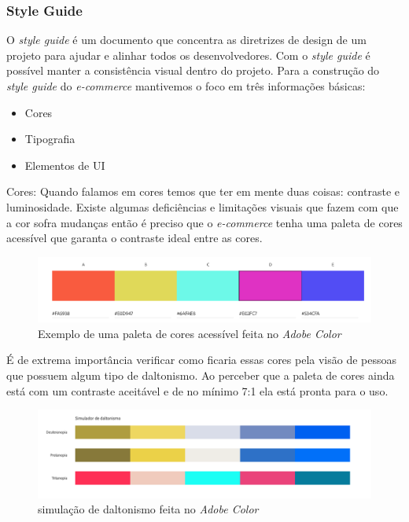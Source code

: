 \newpage
\subsubsection{Style Guide}
{O \textit{style guide} é um documento que concentra as diretrizes de design de um projeto para ajudar e alinhar todos os desenvolvedores. Com o \textit{style guide} é possível manter a consistência visual dentro do projeto. Para a construção do \textit{style guide} do \textit{e-commerce} mantivemos o foco em três informações básicas:
\begin{itemize}
\item Cores
\item Tipografia
\item Elementos de UI
\end{itemize}

\vspace*{20px}
Cores:  Quando falamos em cores temos que ter em mente duas coisas: contraste e luminosidade. Existe algumas deficiências e limitações visuais que fazem com que a cor sofra mudanças então é preciso que o \textit{e-commerce} tenha uma paleta de cores acessível que garanta o contraste ideal entre as cores. 
\begin{figure}[ht]
  		\centering
        \includegraphics[width=1.0\textwidth]{images/paleta_de_cores_acessiveis.png}
        \caption{Exemplo de uma paleta de cores acessível feita no \textit{Adobe Color}}
\end{figure}  
 
\vspace*{50px}
É de extrema importância verificar como ficaria essas cores pela visão de pessoas que possuem algum tipo de daltonismo. Ao perceber que a paleta de cores ainda está com um contraste aceitável e de no mínimo 7:1 ela está pronta para o uso. 
 \begin{figure}[ht]
        \centering
    	\includegraphics[width=1.0\textwidth]{images/paleta_daltonismo.png}
        \caption{simulação de daltonismo feita no \textit{Adobe Color}}
\end{figure}  


}
